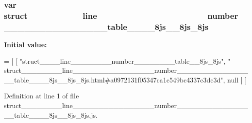 \subsubsection[{struct\+\_\+\+\_\+\+\_\+\+\_\+\+\_\+\+\_\+\+\_\+\+\_\+line\+\_\+\+\_\+\+\_\+\+\_\+\+\_\+\+\_\+\+\_\+\+\_\+\+\_\+\+\_\+\+\_\+\+\_\+\+\_\+\+\_\+\+\_\+\+\_\+number\+\_\+\+\_\+\+\_\+\+\_\+\+\_\+\+\_\+\+\_\+\+\_\+\+\_\+\+\_\+\+\_\+\+\_\+\+\_\+\+\_\+\+\_\+\+\_\+table\+\_\+\+\_\+\+\_\+\+\_\+8js\+\_\+\+\_\+8js\+\_\+8js}]{\setlength{\rightskip}{0pt plus 5cm}var struct\+\_\+\+\_\+\+\_\+\+\_\+\+\_\+\+\_\+\+\_\+\+\_\+line\+\_\+\+\_\+\+\_\+\+\_\+\+\_\+\+\_\+\+\_\+\+\_\+\+\_\+\+\_\+\+\_\+\+\_\+\+\_\+\+\_\+\+\_\+\+\_\+number\+\_\+\+\_\+\+\_\+\+\_\+\+\_\+\+\_\+\+\_\+\+\_\+\+\_\+\+\_\+\+\_\+\+\_\+\+\_\+\+\_\+\+\_\+\+\_\+table\+\_\+\+\_\+\+\_\+\+\_\+8js\+\_\+\+\_\+8js\+\_\+8js}\label{struct________________line________________________________number________________________________e03013ad84030bbcd337812cb8789d38_ac3052b8841d7c6685f7ddb9c478696f1}
{\bfseries Initial value\+:}
\begin{DoxyCode}
=
[
    [ \textcolor{stringliteral}{"struct\_\_\_\_line\_\_\_\_\_\_\_\_number\_\_\_\_\_\_\_\_table\_\_8js\_8js"}, \textcolor{stringliteral}{"
      struct\_\_\_\_\_\_\_\_line\_\_\_\_\_\_\_\_\_\_\_\_\_\_\_\_number\_\_\_\_\_\_\_\_\_\_\_\_\_\_\_\_table\_\_\_\_8js\_\_8js\_8js.html#a0972131f05347ca1c549bc4337c3dc3d"}, null ]
]
\end{DoxyCode}


Definition at line 1 of file struct\+\_\+\+\_\+\+\_\+\+\_\+\+\_\+\+\_\+\+\_\+\+\_\+line\+\_\+\+\_\+\+\_\+\+\_\+\+\_\+\+\_\+\+\_\+\+\_\+\+\_\+\+\_\+\+\_\+\+\_\+\+\_\+\+\_\+\+\_\+\+\_\+number\+\_\+\+\_\+\+\_\+\+\_\+\+\_\+\+\_\+\+\_\+\+\_\+\+\_\+\+\_\+\+\_\+\+\_\+\+\_\+\+\_\+\+\_\+\+\_\+table\+\_\+\+\_\+\+\_\+\+\_\+8js\+\_\+\+\_\+8js\+\_\+8js.\+js.


